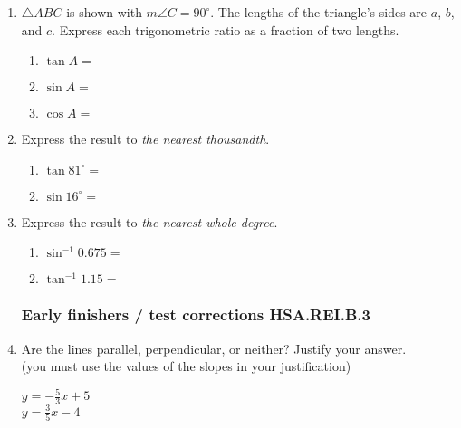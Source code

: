 \begin{enumerate}
\item $\triangle ABC$ is shown with $m\angle C=90^\circ$. The lengths of the triangle's sides are $a$, $b$, and $c$. Express each trigonometric ratio as a fraction of two lengths. \vspace{1cm}
\begin{multicols}{2}
      \begin{enumerate}
        \item $\tan A =$ \vspace{0.75cm}
        \item $\sin A =$ \vspace{0.75cm}
        \item $\cos A =$ \vspace{0.75cm}
    \end{enumerate}
\end{multicols} \vspace{0.5cm}

\item Express the result to \emph{the nearest thousandth}.
\begin{multicols}{2}
  \begin{enumerate}
    \item $\tan 81^\circ =$
    \item $\sin 16^\circ =$
  \end{enumerate}
\end{multicols} \vspace{1cm}

\item Express the result to \emph{the nearest whole degree}.
\begin{multicols}{2}
  \begin{enumerate}
    \item $\sin^{-1} 0.675 =$
    \item $\tan^{-1} 1.15 =$
  \end{enumerate}
\end{multicols}

\newpage
\subsubsection*{Early finishers / test corrections \hfill HSA.REI.B.3}
\item Are the lines parallel, perpendicular, or neither? Justify your answer. \\(you must use the values of the slopes in your justification)
  \begin{multicols}{2}
    $y = -\frac{5}{3}x+5$ \\
    $y = \frac{3}{5}x-4$
  \end{multicols} \vspace{3cm}


\end{enumerate}
